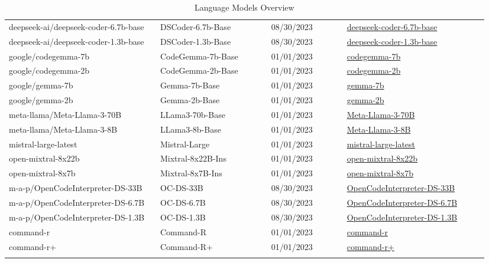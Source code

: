 \begin{longtable}{|p{0.3\linewidth}|p{0.22\linewidth}|p{0.15\linewidth}|p{0.28\linewidth}|}
deepseek-ai/deepseek-coder-6.7b-base & DSCoder-6.7b-Base & 08/30/2023 & \href{https://huggingface.co/deepseek-ai/deepseek-coder-6.7b-base}{deepseek-coder-6.7b-base} \\ 
deepseek-ai/deepseek-coder-1.3b-base & DSCoder-1.3b-Base & 08/30/2023 & \href{https://huggingface.co/deepseek-ai/deepseek-coder-1.3b-base}{deepseek-coder-1.3b-base} \\ 
google/codegemma-7b & CodeGemma-7b-Base & 01/01/2023 & \href{https://huggingface.co/google/codegemma-7b}{codegemma-7b} \\ 
google/codegemma-2b & CodeGemma-2b-Base & 01/01/2023 & \href{https://huggingface.co/google/codegemma-2b}{codegemma-2b} \\ 
google/gemma-7b & Gemma-7b-Base & 01/01/2023 & \href{https://huggingface.co/google/gemma-7b}{gemma-7b} \\ 
google/gemma-2b & Gemma-2b-Base & 01/01/2023 & \href{https://huggingface.co/google/gemma-2b}{gemma-2b} \\ 
meta-llama/Meta-Llama-3-70B & LLama3-70b-Base & 01/01/2023 & \href{https://huggingface.co/meta-llama/Meta-Llama-3-70B}{Meta-Llama-3-70B} \\ 
meta-llama/Meta-Llama-3-8B & LLama3-8b-Base & 01/01/2023 & \href{https://huggingface.co/meta-llama/Meta-Llama-3-8B}{Meta-Llama-3-8B} \\ 
mistral-large-latest & Mistral-Large & 01/01/2023 & \href{https://mistral.ai/news/mistral-large/}{mistral-large-latest} \\ 
open-mixtral-8x22b & Mixtral-8x22B-Ins & 01/01/2023 & \href{https://mistral.ai/news/mixtral-8x22b/}{open-mixtral-8x22b} \\ 
open-mixtral-8x7b & Mixtral-8x7B-Ins & 01/01/2023 & \href{https://mistral.ai/news/mixtral-8x7b/}{open-mixtral-8x7b} \\ 
m-a-p/OpenCodeInterpreter-DS-33B & OC-DS-33B & 08/30/2023 & \href{https://huggingface.co/m-a-p/OpenCodeInterpreter-DS-33B/}{OpenCodeInterpreter-DS-33B} \\ 
m-a-p/OpenCodeInterpreter-DS-6.7B & OC-DS-6.7B & 08/30/2023 & \href{https://huggingface.co/m-a-p/OpenCodeInterpreter-DS-6.7B/}{OpenCodeInterpreter-DS-6.7B} \\ 
m-a-p/OpenCodeInterpreter-DS-1.3B & OC-DS-1.3B & 08/30/2023 & \href{https://huggingface.co/m-a-p/OpenCodeInterpreter-DS-1.3B/}{OpenCodeInterpreter-DS-1.3B} \\ 
command-r & Command-R & 01/01/2023 & \href{https://docs.cohere.com/docs/models}{command-r} \\ 
command-r+ & Command-R+ & 01/01/2023 & \href{https://docs.cohere.com/docs/models}{command-r+} \\ 
    \caption{Language Models Overview}
    \label{tab:models_list}
    \end{longtable}
